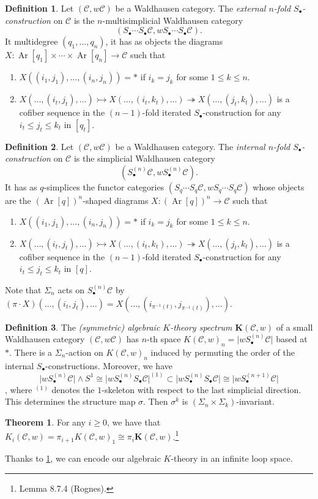 \documentclass[10pt,letterpaper,cm]{nupset}
\theoremstyle{definition}
\newtheorem{definition}{Definition}
\theoremstyle{theorem}
\newtheorem{theorem}{Theorem}
\theoremstyle{remark}
\newcommand{\1}{\mathbf{1}}
\renewcommand{\c}{\mathscr{C}}
\newcommand{\0}{\vec 0}
\DeclareMathOperator{\Ar}{Ar}
\begin{document}
\begin{definition}
Let $(\c, w\c)$ be a Waldhausen category. The \textit{external $n$-fold $S_{\bullet}$-construction} on $\c$ is the $n$-multisimplicial Waldhausen category $$\left(S_{\bullet}\cdots S_{\bullet}\c, wS_{\bullet} \cdots S_{\bullet} \c\right).$$ It multidegree $(q_1, \ldots, q_n)$, it has as objects the diagrams  $X: \Ar[q_1] \times \cdots \times \Ar[q_n] \to \c$ such that
\begin{enumerate}
\item $X((i_1, j_1), \ldots, (i_n, j_n)) = \ast$ if $i_k = j_k$ for some $1\leq k \leq n$.
\item $X(\ldots, (i_t, j_t), \ldots) \rightarrowtail X(\ldots, (i_t, k_t), \ldots) \twoheadrightarrow X(\ldots, (j_t, k_t), \ldots)$ is a cofiber sequence  in the $(n-1)$-fold iterated $S_{\bullet}$-construction for any $i_t \leq j_t \leq k_t$ in $[q_t]$.
\end{enumerate}
\end{definition}

\begin{definition}
Let $\left(\c, w\c\right)$ be a Waldhausen category. The \textit{internal $n$-fold $S_{\bullet}$-construction} on $\c$ is the simplicial Waldhausen category $$(S_{\bullet}^{(n)}\c, wS_{\bullet}^{(n)} \c).$$ It has as $q$-simplices the functor categories $(S_q \cdots S_q \c, wS_q \cdots S_q \c)$ whose objects are the $\left(\Ar[q]\right)^n$-shaped diagrams  $X: \left(\Ar[q]\right)^n\to \c$ such that
\begin{enumerate}
\item $X((i_1, j_1), \ldots, (i_n, j_n)) = \ast$ if $i_k = j_k$ for some $1\leq k \leq n$.
\item $X(\ldots, (i_t, j_t), \ldots) \rightarrowtail X(\ldots, (i_t, k_t), \ldots) \twoheadrightarrow X(\ldots, (j_t, k_t), \ldots)$ is a cofiber sequence  in the $(n-1)$-fold iterated $S_{\bullet}$-construction for any $i_t \leq j_t \leq k_t$ in $[q]$.
\end{enumerate}
Note that $\Sigma_n$ acts on $S_{\bullet}^{(n)}\c$ by $(\pi \cdot X)(\ldots, (i_t, j_t), \ldots) = X(\ldots, (i_{\pi^{{-}1}(t)}, j_{\pi^{{-}1}(t)}), \ldots)$.
\end{definition}

\begin{definition}
The \textit{(symmetric) algebraic $K$-theory  spectrum $\mathbf{K}(\c, w)$} of a small Waldhausen category $\left(\c, w\c\right)$ has $n$-th space $K(\c, w)_n = \lvert{wS_{\bullet}^{(n)}\c}\rvert$ based at $\ast$. There is a $\Sigma_n$-action on $K(\c, w)_n$ induced by permuting the order of the internal $S_{\bullet}$-constructions. Moreover, we have $$\lvert{wS_{\bullet}^{(n)}\c}\rvert \land S^1 \cong \lvert{wS_{\bullet}^{(n)}S_{\bullet}\c}\rvert^{(1)} \subset \lvert{wS_{\bullet}^{(n)}S_{\bullet}\c}\rvert \cong \lvert{wS_{\bullet}^{(n+1)}\c}\rvert$$, where $^{(1)}$ denotes the $1$-skeleton with respect to the last simplicial direction. This determines the structure map $\sigma$. Then $\sigma^k$ is $\left(\Sigma_{n} \times \Sigma_{k}\right)$-invariant.
\end{definition}


\begin{theorem}\label{lt}
For any $i\geq 0$, we have that $K_i(\c, w) = \pi_{i+1}K(\c, w)_1 \cong \pi_i \mathbf{K}(\c, w)$.\footnote{Lemma 8.7.4 (Rognes).}
\end{theorem}



Thanks to \cref{lt}, we can encode our algebraic $K$-theory in an infinite loop space.
\end{document}
